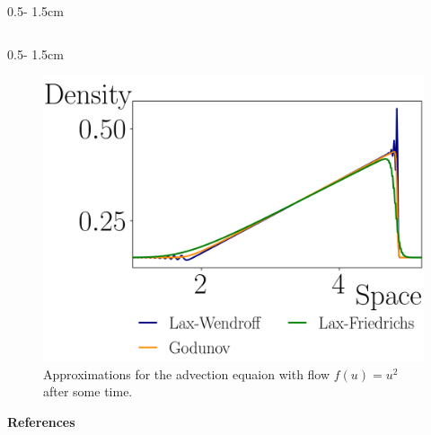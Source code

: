 \documentclass{uibposter}
\begin{document}
\begin{frame}[fragile]
\begin{columns}
\begin{column}{0.5\textwidth - 1.5cm}
\begin{column}{0.5\textwidth - 1.5cm}
	\begin{figure}
	    \includegraphics{fig/burger_compare.png}
	    \caption{Approximations for the advection equaion with flow $f(u) = u^2$ after some time.}
	    \label{img:burger_comprehension}
	\end{figure}
    
    \textbf{\scriptsize{References}}
    \vspace{0.3cm}
    \nocite{*} 
    
    
    

\end{column}
\end{column}
\end{columns}





\end{frame}
\end{document}
